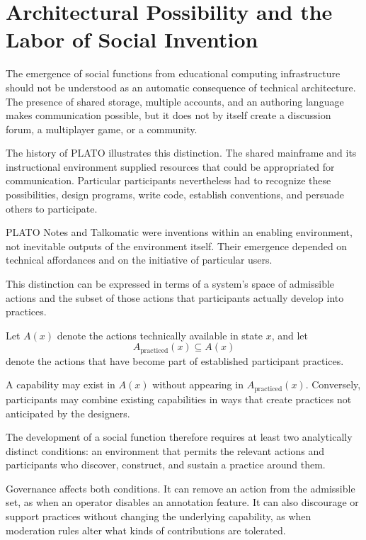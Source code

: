 \documentclass[11pt]{article}
\theoremstyle{remark}
\begin{document}
\section{Architectural Possibility and the Labor of Social Invention}
\label{sec:social-invention}

The emergence of social functions from educational
computing infrastructure should not be understood
as an automatic consequence of technical architecture.
The presence of shared storage, multiple accounts,
and an authoring language makes communication
possible, but it does not by itself create a
discussion forum, a multiplayer game, or a
community.

The history of PLATO illustrates this distinction.
The shared mainframe and its instructional
environment supplied resources that could be
appropriated for communication. Particular
participants nevertheless had to recognize these
possibilities, design programs, write code,
establish conventions, and persuade others to
participate.

PLATO Notes and Talkomatic were inventions within
an enabling environment, not inevitable outputs
of the environment itself. Their emergence
depended on technical affordances and on the
initiative of particular users.

This distinction can be expressed in terms of
a system's space of admissible actions and the
subset of those actions that participants actually
develop into practices.

Let $A(x)$ denote the actions technically
available in state $x$, and let
\[
A_{\mathrm{practiced}}(x)\subseteq A(x)
\]
denote the actions that have become part of
established participant practices.

A capability may exist in $A(x)$ without
appearing in $A_{\mathrm{practiced}}(x)$.
Conversely, participants may combine existing
capabilities in ways that create practices
not anticipated by the designers.

The development of a social function therefore
requires at least two analytically distinct
conditions: an environment that permits the
relevant actions and participants who discover,
construct, and sustain a practice around them.

Governance affects both conditions. It can
remove an action from the admissible set,
as when an operator disables an annotation
feature. It can also discourage or support
practices without changing the underlying
capability, as when moderation rules alter
what kinds of contributions are tolerated.
\end{document}
